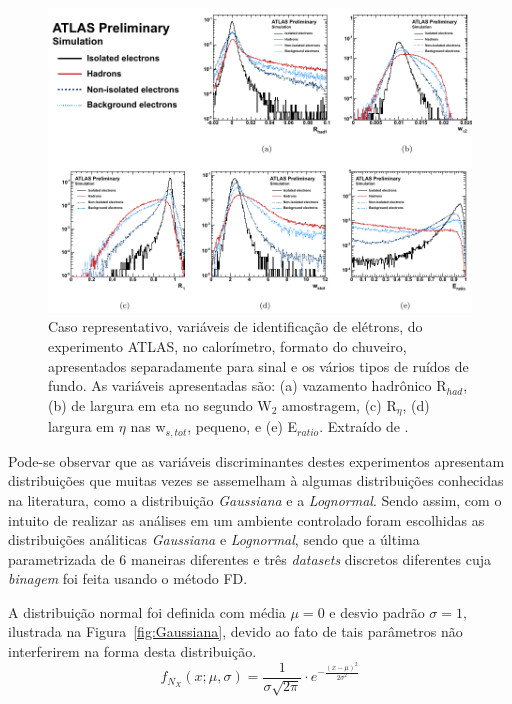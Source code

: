 \begin{figure}[H]
	\begin{center}
		\includegraphics[width=0.8\linewidth]{./figuras/variaveisATLAS.pdf}
		\caption{Caso representativo, variáveis de identificação de elétrons, do experimento ATLAS, no calorímetro, formato do chuveiro, apresentados separadamente para sinal e os vários tipos de ruídos de fundo. As variáveis apresentadas são: (a) vazamento hadrônico R${_{had}}$, (b) de largura em eta no segundo W${_2}$ amostragem, (c) R${_\eta}$, (d) largura em $\eta$ nas w${_{s,tot}}$, pequeno, e (e) E${_{ratio}}$. Extraído de \cite{alison2014road}.}\label{fig:16}
	\end{center}
\end{figure}

Pode-se observar que as variáveis discriminantes destes experimentos apresentam distribuições que muitas vezes se assemelham à algumas distribuições conhecidas na literatura, como a distribuição \textit{Gaussiana} e a \textit{Lognormal}. Sendo assim, com o intuito de realizar as análises em um ambiente controlado foram escolhidas as distribuições análiticas \textit{Gaussiana} e \textit{Lognormal}, sendo que a última parametrizada de 6 maneiras diferentes e três \textit{datasets} discretos diferentes cuja \textit{binagem} foi feita usando o método \ac{FD}.

A distribuição normal foi definida com média $ \mu =0 $ e desvio padrão $ \sigma = 1 $, ilustrada na Figura~\ref{fig:Gaussiana}, devido ao fato de tais parâmetros não interferirem na forma desta distribuição.
\begin{equation}
{\displaystyle f_{N_X}(x;\mu,\sigma) = \frac{1}{\sigma\sqrt{2\pi}}\cdot e^{-\frac{(x-\mu)^2}{2\sigma^2}}}
\label{equ:Normal}
\end{equation}

